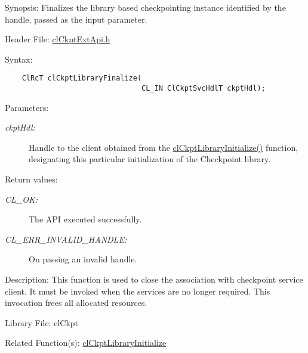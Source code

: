 \begin{Desc}
\item[Synopsis:]Finalizes the library based checkpointing instance identified by the handle, passed as the input parameter.\end{Desc}
\begin{Desc}
\item[Header File:]\hyperlink{cl_ckpt_ext_api_8h}{cl\-Ckpt\-Ext\-Api.h}\end{Desc}
\begin{Desc}
\item[Syntax:]

\footnotesize\begin{verbatim}    ClRcT clCkptLibraryFinalize(
                                CL_IN ClCkptSvcHdlT ckptHdl);
\end{verbatim}
\normalsize
\end{Desc}
\begin{Desc}
\item[Parameters:]
\begin{description}
\item[{\em ckpt\-Hdl:}]Handle to the client obtained from the \hyperlink{group__group10_ga2}{cl\-Ckpt\-Library\-Initialize()} function, designating this particular initialization of the Checkpoint library.\end{description}
\end{Desc}
\begin{Desc}
\item[Return values:]
\begin{description}
\item[{\em CL\_\-OK:}]The API executed successfully. \item[{\em CL\_\-ERR\_\-INVALID\_\-HANDLE:}]On passing an invalid handle.\end{description}
\end{Desc}
\begin{Desc}
\item[Description:]This function is used to close the association with checkpoint service client. It must be invoked when the services are no longer required. This invocation frees all allocated resources.\end{Desc}
\begin{Desc}
\item[Library File:]cl\-Ckpt\end{Desc}
\begin{Desc}
\item[Related Function(s):]\hyperlink{group__group10}{cl\-Ckpt\-Library\-Initialize} \end{Desc}
